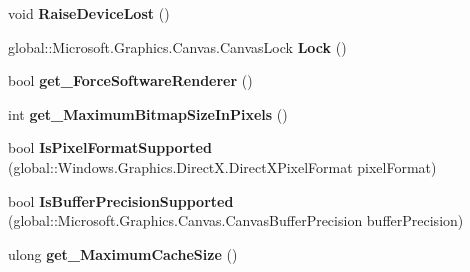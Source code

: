 \begin{DoxyCompactItemize}
\mbox{\label{interface_microsoft_1_1_graphics_1_1_canvas_1_1_i_canvas_device_a6b74db4223ca531731fcff1891a390d8}} 
void {\bfseries Raise\+Device\+Lost} ()
\item 
\mbox{\label{interface_microsoft_1_1_graphics_1_1_canvas_1_1_i_canvas_device_ac7789f0058908fdfff7cf83b25227a23}} 
global\+::\+Microsoft.\+Graphics.\+Canvas.\+Canvas\+Lock {\bfseries Lock} ()
\item 
\mbox{\label{interface_microsoft_1_1_graphics_1_1_canvas_1_1_i_canvas_device_a71ebd55a219b2267a83a68fa3caf42a0}} 
bool {\bfseries get\+\_\+\+Force\+Software\+Renderer} ()
\item 
\mbox{\label{interface_microsoft_1_1_graphics_1_1_canvas_1_1_i_canvas_device_a898fb605ef7e1454030d832f6091f198}} 
int {\bfseries get\+\_\+\+Maximum\+Bitmap\+Size\+In\+Pixels} ()
\item 
\mbox{\label{interface_microsoft_1_1_graphics_1_1_canvas_1_1_i_canvas_device_a1bbc8a4c7b32d66babc6a466f3947580}} 
bool {\bfseries Is\+Pixel\+Format\+Supported} (global\+::\+Windows.\+Graphics.\+Direct\+X.\+Direct\+X\+Pixel\+Format pixel\+Format)
\item 
\mbox{\label{interface_microsoft_1_1_graphics_1_1_canvas_1_1_i_canvas_device_acfa5f7ea5e23895e632195b070bb4023}} 
bool {\bfseries Is\+Buffer\+Precision\+Supported} (global\+::\+Microsoft.\+Graphics.\+Canvas.\+Canvas\+Buffer\+Precision buffer\+Precision)
\item 
\mbox{\label{interface_microsoft_1_1_graphics_1_1_canvas_1_1_i_canvas_device_a4004fcfc71e1035a4e3e56590d32a11a}} 
ulong {\bfseries get\+\_\+\+Maximum\+Cache\+Size} ()
\item 
\mbox{\label{interface_microsoft_1_1_graphics_1_1_canvas_1_1_i_canvas_device_a3812c813e00bdc30b376b38962b40ba7}} 

\end{DoxyCompactItemize}
